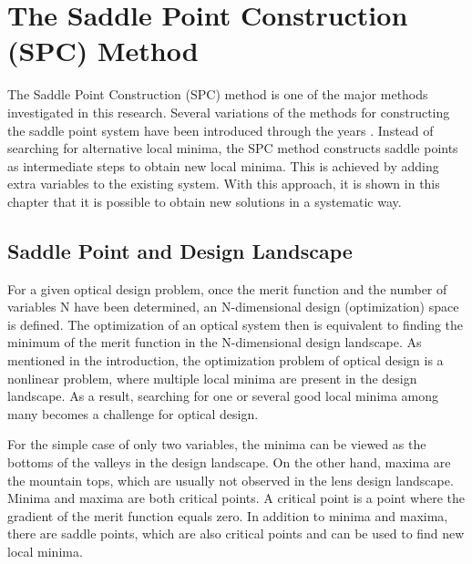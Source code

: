 \chapter{The Saddle Point Construction (SPC) Method}
\label{chapter_SPC_method_reccomendation}
\graphicspath{ {./chapter-sp/figures/} }
\captionsetup[figure]{labelfont=bf}
\captionsetup{margin=1.5em}
\captionsetup[table]{labelfont=bf}





\noindent 
The Saddle Point Construction (SPC) method is one of the major methods investigated in this research. Several variations of the methods for constructing the saddle point system have been introduced through the years \cite{BociortSPCSexplained}\cite{MVTurnhoutSPC15}\cite{HouProc2015}. Instead of searching for alternative local minima, the SPC method constructs saddle points as intermediate steps to obtain new local minima. This is achieved by adding extra variables to the existing system. With this approach, it is shown in this chapter that it is possible to obtain new solutions in a systematic way. 

\section{Saddle Point and Design Landscape}
For a given optical design problem, once the merit function and the number of variables N have been determined, an N-dimensional design (optimization) space is defined. The optimization of an optical system then is equivalent to finding the minimum of the merit function in the N-dimensional design landscape. As mentioned in the introduction, the optimization problem of optical design is a nonlinear problem, where multiple local minima are present in the design landscape. As a result, searching for one or several good local minima among many becomes a challenge for optical design. 

For the simple case of only two variables, the minima can be viewed as the bottoms of the valleys in the design landscape. On the other hand, maxima are the mountain tops, which are usually not observed in the lens design landscape. Minima and maxima are both critical points. A critical point is a point where the gradient of the merit function equals zero. In addition to minima and maxima, there are saddle points, which are also critical points and can be used to find new local minima.

